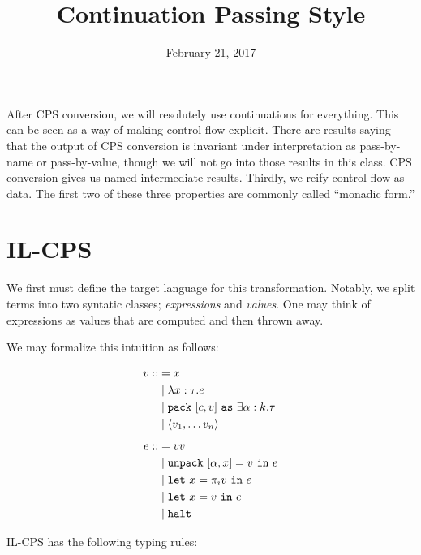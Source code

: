 \documentclass{article}
\title{Continuation Passing Style}
\date{February 21, 2017}
\newcommand{\pack}{\text{\texttt{pack} }}
\newcommand{\unpack}{\text{\texttt{unpack} }}
\newcommand{\iin}{\text{ \texttt{in} }}
\newcommand{\halt}{\text{\texttt{halt}}}
\newcommand{\llet}{\text{\texttt{let} }}
\newcommand{\as}{\text{ \texttt{as} }}
\begin{document}
\maketitle

After CPS conversion, we will resolutely use continuations for everything. This
can be seen as a way of making control flow explicit. There are results saying
that the output of CPS conversion is invariant under interpretation as
pass-by-name or pass-by-value, though we will not go into those results in this
class. CPS conversion gives us named intermediate results. Thirdly, we reify
control-flow as data. The first two of these three properties are commonly
called ``monadic form.''

\section{IL-CPS}

We first must define the target language for this transformation. Notably, we
split terms into two syntatic classes; \emph{expressions} and \emph{values}. One
may think of expressions as values that are computed and then thrown away.

We may formalize this intuition as follows:

\begin{align*}
v ::&= x\\
&\mid \lambda x : \tau . e\\
&\mid \pack [c,v] \as \exists \alpha : k .\tau\\
&\mid \langle v_1, \ldots v_n \rangle\\[1ex]
e ::&= v v \\
&\mid \unpack [\alpha, x] = v \iin e\\
&\mid \llet x = \pi_i v \iin e\\
&\mid \llet x = v \iin e\\
&\mid \halt
\end{align*}

IL-CPS has the following typing rules:
\end{document}
